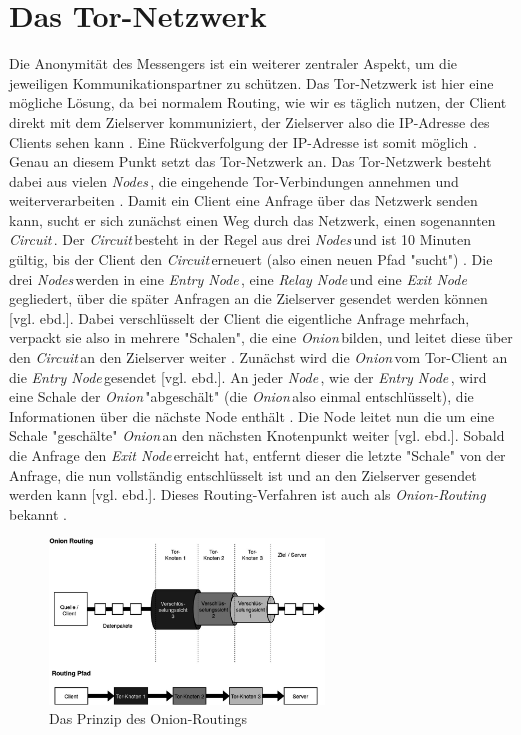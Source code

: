 \documentclass[a4paper,ngerman, headheight=28pt,12pt]{scrartcl}
\newcommand{\vcite}[1]{\cite[vgl.][]{#1}}
\newcommand{\vebd}{[vgl. ebd.]}
\newcommand{\entryn}{\textit{Entry Node\,}}
\newcommand{\relayn}{\textit{Relay Node\,}}
\newcommand{\exitn}{\textit{Exit Node\,}}
\newcommand{\nodes}{\textit{Nodes\,}}
\newcommand{\node}{\textit{Node\,}}
\newcommand{\onion}{\textit{Onion\,}}
\newcommand{\circuit}{\textit{Circuit\,}}
\begin{document}
\section{Das Tor-Netzwerk}
Die Anonymität des Messengers ist ein weiterer zentraler Aspekt, um die jeweiligen Kommunikationspartner zu schützen. Das Tor-Netzwerk ist hier eine mögliche Lösung, da bei normalem Routing, wie wir es täglich nutzen, der Client direkt mit dem Zielserver kommuniziert, der Zielserver also die IP-Adresse des Clients sehen kann \vcite{TCP_IP}.
Eine Rückverfolgung der IP-Adresse ist somit möglich \vcite{LocPolice}. Genau an diesem Punkt setzt das Tor-Netzwerk an. Das Tor-Netzwerk besteht dabei aus vielen \nodes, die eingehende Tor-Verbindungen annehmen und weiterverarbeiten \vcite{TorStructure}. Damit ein Client eine Anfrage über das Netzwerk senden kann, sucht er sich zunächst einen Weg durch das Netzwerk, einen sogenannten \circuit \vcite{TorCircuits}. Der \circuit besteht in der Regel aus drei \nodes und ist 10 Minuten gültig, bis der Client den \circuit erneuert (also einen neuen Pfad "sucht") \vcite{FAQCircuitLifetime}. Die drei \nodes werden in eine \entryn, eine \relayn und eine \exitn gegliedert, über die später Anfragen an die Zielserver gesendet werden können \vebd. Dabei verschlüsselt der Client die eigentliche Anfrage mehrfach, verpackt sie also in mehrere "Schalen", die eine \onion bilden, und leitet diese über den \circuit an den Zielserver weiter \vcite{TorDesign}. Zunächst wird die \onion vom Tor-Client an die \entryn gesendet \vebd. An jeder \node, wie der \entryn, wird eine Schale der \onion "abgeschält" (die \onion also einmal entschlüsselt), die Informationen über die nächste Node enthält \vcite{TorStructure2}. Die Node leitet nun die um eine Schale "geschälte" \onion an den nächsten Knotenpunkt weiter \vebd. Sobald die Anfrage den \exitn erreicht hat, entfernt dieser die letzte "Schale" von der Anfrage, die nun vollständig entschlüsselt ist und an den Zielserver gesendet werden kann \vebd. Dieses Routing-Verfahren ist auch als \textit{Onion-Routing} bekannt \vcite{TorDesign}.

\begin{figure}[h]
  \centering
  \includegraphics[width=0.65\textwidth]{TorRoutingSimple.png}
  \caption{Das Prinzip des Onion-Routings \vcite{fig:Tor-Structure} \label{fig:TorStructure}}
\end{figure}
\end{document}
